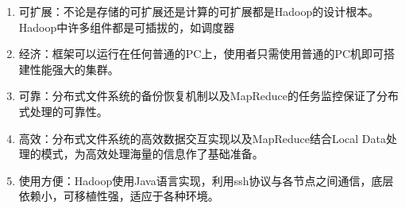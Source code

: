 \begin{enumerate}
\item 可扩展：不论是存储的可扩展还是计算的可扩展都是Hadoop的设计根本。Hadoop中许多组件都是可插拔的，如调度器

\item 经济：框架可以运行在任何普通的PC上，使用者只需使用普通的PC机即可搭建性能强大的集群。

\item 可靠：分布式文件系统的备份恢复机制以及MapReduce的任务监控保证了分布式处理的可靠性。

\item 高效：分布式文件系统的高效数据交互实现以及MapReduce结合Local Data处理的模式，为高效处理海量的信息作了基础准备。

\item 使用方便：Hadoop使用Java语言实现，利用ssh协议与各节点之间通信，底层依赖小，可移植性强，适应于各种环境。
\end{enumerate}

